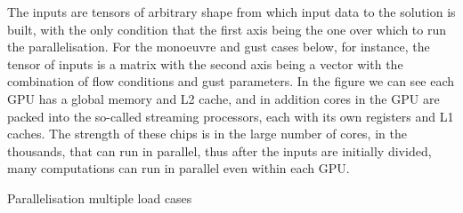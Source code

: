 \documentclass[11pt]{article}
\begin{document}
The inputs are tensors of arbitrary shape from which input data to the solution is built, with the only condition that the first axis being the one over which to run the parallelisation. For the monoeuvre and gust cases below, for instance, the tensor of inputs is a matrix with the second axis being a vector with the combination of flow conditions and gust parameters.   
In the figure we can see each GPU has a global memory and L2 cache, and in addition cores in the GPU are packed into the so-called streaming processors, each with its own registers and L1 caches. The strength of these chips is in the large number of cores, in the thousands, that can run in parallel, thus after the inputs are initially divided, many computations can run in parallel even within each GPU.

\begin{algorithm}[h!]
\DontPrintSemicolon
{}
\caption{Parallelisation multiple load cases}
\label{org0c0e267}
\end{algorithm}
\end{document}
